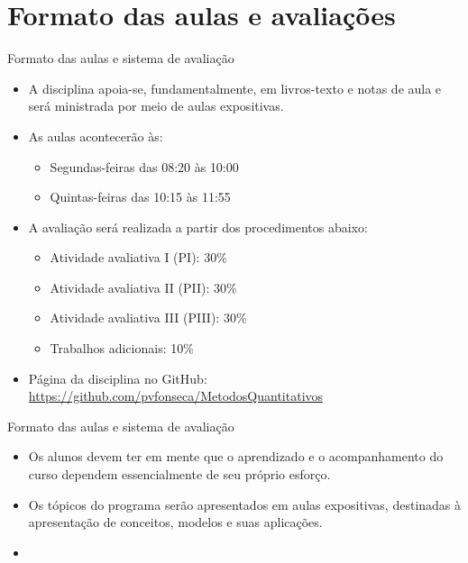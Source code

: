 \documentclass[10pt]{beamer}
\begin{document}
\section{Formato das aulas e avaliações}
\begin{frame}{Formato das aulas e sistema de avaliação}
    \begin{itemize}
        \item A disciplina apoia-se, fundamentalmente, em livros-texto e notas de aula e será ministrada por meio de aulas expositivas.\bigskip

        \item As aulas acontecerão às:
              \begin{itemize}
                  \item Segundas-feiras das 08:20 às 10:00
                  \item Quintas-feiras das 10:15 às 11:55\bigskip
              \end{itemize}

        \item A avaliação será realizada a partir dos procedimentos abaixo:
              \begin{itemize}
                  \item Atividade avaliativa I (PI): 30\%
                  \item Atividade avaliativa II (PII): 30\%
                  \item Atividade avaliativa III (PIII): 30\%
                  \item Trabalhos adicionais: 10\%\bigskip
              \end{itemize}

        \item Página da disciplina no GitHub: \href{github.com/pvfonseca/MetodosQuantitativos}{https://github.com/pvfonseca/MetodosQuantitativos}
    \end{itemize}
\end{frame}

\begin{frame}{Formato das aulas e sistema de avaliação}
    \begin{itemize}
        \item Os alunos devem ter em mente que o aprendizado e o acompanhamento do curso dependem essencialmente de seu próprio esforço.\bigskip

        \item Os tópicos do programa serão apresentados em aulas expositivas, destinadas à apresentação de conceitos, modelos e suas aplicações.\bigskip

        \item[\emoji{warning}] 
    \end{itemize}

\end{frame}
\end{document}

